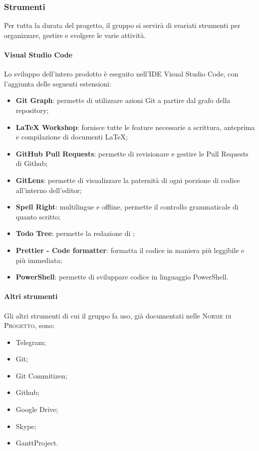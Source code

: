 \documentclass[../norme-di-progetto.tex]{subfiles}
\begin{document}
\subsubsection{Strumenti}
Per tutta la durata del progetto, il gruppo si servirà di svariati strumenti per organizzare, gestire e svolgere le varie attività.
\paragraph{Visual Studio Code}
Lo sviluppo dell'intero prodotto è eseguito nell'IDE Visual Studio Code, con l'aggiunta delle seguenti estensioni:
\begin{itemize}
  \item \textbf{Git Graph}: permette di utilizzare azioni Git a partire dal grafo della repository;
  \item \textbf{LaTeX Workshop}: fornisce tutte le feature necessarie a scrittura, anteprima e compilazione di documenti \LaTeX;
  \item \textbf{GitHub Pull Requests}: permette di revisionare e gestire le Pull Requests di Github;
  \item \textbf{GitLens}: permette di visualizzare la paternità di ogni porzione di codice all'interno dell'editor;
  \item \textbf{Spell Right}:  multilingue e offline, permette il controllo grammaticale di quanto scritto;
  \item \textbf{Todo Tree}: permette la redazione di ;
  \item \textbf{Prettier - Code formatter}: formatta il codice in maniera più leggibile e più immediata;
  \item \textbf{PowerShell}: permette di sviluppare codice in linguaggio PowerShell.
\end{itemize}

\paragraph{Altri strumenti}
Gli altri strumenti di cui il gruppo fa uso, già documentati nelle \textsc{Norme di Progetto}, sono:
\begin{itemize}
  \item Telegram;
  \item Git;
  \item Git Commitizen;
  \item Github;
  \item Google Drive;
  \item Skype;
  \item GanttProject.
\end{itemize}
\end{document}
